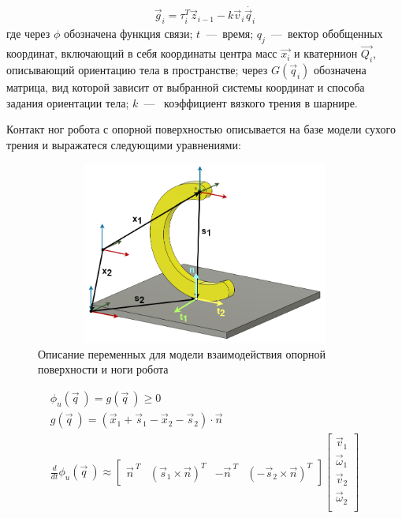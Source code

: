 \begin{align}
    \label{eq:phys_constr}
    \vec{g}_i = \tau_i^T \vec{z}_{i-1} -k\vec{v}_i \dot{\vec{q}_i} 
\end{align}
где через $\phi$ обозначена функция связи; $t$~---~время; $q_{j}$~---~вектор обобщенных координат, включающий в себя координаты центра масс $\vec{x_i}$ и кватернион $\vec{Q_i}$, описывающий ориентацию тела в пространстве; через $G(\vec{q}_i)$ обозначена матрица, вид которой зависит от выбранной системы координат и способа задания ориентации тела; $k$~---~ коэффициент вязкого трения в шарнире.

Контакт ног робота с опорной поверхностью  описывается на базе модели сухого трения и выражатеся следующими уравнениями:

\begin{figure}[H]
    \centering\includegraphics[height=6cm,width=1\textwidth,keepaspectratio]{images/contact_interaction.png}
    \caption{Описание переменных для модели взаимодействия опорной поверхности и ноги робота}
    \label{fig:contact_interaction.png}
\end{figure}

\begin{align}
    \label{eq:contact_inter}
    \phi_u(\vec{q}\ ) = g(\vec{q}\ ) \geqslant 0 \\ 
    g(\vec{q}\ ) = (\vec{x}_1 + \vec{s}_1 - \vec{x}_2 - \vec{s}_2) \cdot \vec{n} \\
    \frac{d }{d t}\phi_u(\vec{q}\ ) \approx \begin{bmatrix}
        \vec{n}^{\ T} & (\vec{s}_1 \times \vec{n})^T & -\vec{n}^{\ T} & (-\vec{s}_2 \times \vec{n})^T
    \end{bmatrix} \begin{bmatrix}
        \vec{v}_1\\ 
    \vec{\omega}_1\\ 
    \vec{v}_2\\
    \vec{\omega}_2\\
    \end{bmatrix}
\end{align} 

